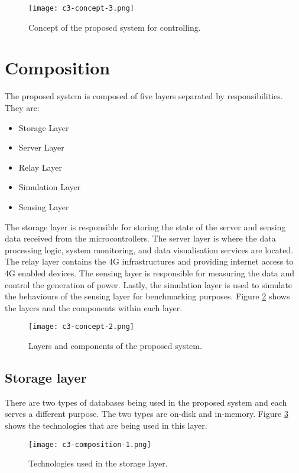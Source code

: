 \documentclass[../thesis.tex]{subfiles}
\begin{document}
\begin{figure}[!ht]
  \texttt{[image: c3-concept-3.png]}
  \caption{Concept of the proposed system for controlling.}
  \label{fig:concept3}
\end{figure}


\newpage
\section{Composition}

The proposed system is composed of five layers separated by responsibilities. They are:

\begin{itemize}
	\item Storage Layer
	\item Server Layer
	\item Relay Layer
	\item Simulation Layer
	\item Sensing Layer
\end{itemize}

The storage layer is responsible for storing the state of the server and sensing data received from the microcontrollers. The server layer is where the data processing logic, system monitoring, and data visualisation services are located. The relay layer contains the 4G infrastructures and providing internet access to 4G enabled devices. The sensing layer is responsible for measuring the data and control the generation of power. Lastly, the simulation layer is used to simulate the behaviours of the sensing layer for benchmarking purposes. Figure \ref{fig:concept2} shows the layers and the components within each layer.

\begin{figure}[!ht]
  \texttt{[image: c3-concept-2.png]}
  \caption{Layers and components of the proposed system.}
  \label{fig:concept2}
\end{figure}


\subsection{Storage layer}

There are two types of databases being used in the proposed system and each serves a different purpose. The two types are on-disk and in-memory. Figure \ref{fig:composition1} shows the technologies that are being used in this layer.

\begin{figure}[!ht]
  \texttt{[image: c3-composition-1.png]}
  \caption{Technologies used in the storage layer.}
  \label{fig:composition1}
\end{figure}
\end{document}
